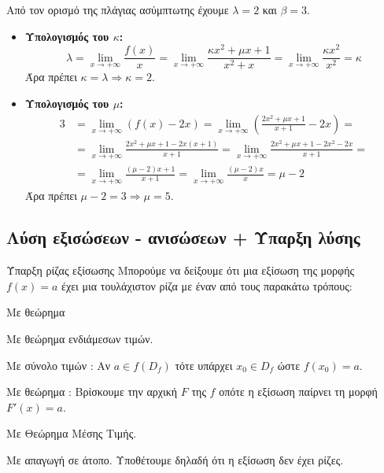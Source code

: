 
\lysh
Από τον ορισμό της πλάγιας ασύμπτωτης έχουμε $\lambda=2$ και $\beta=3$.
\begin{itemize}
    \item \textbf{Υπολογισμός του $\kappa$:}
    \[ \lambda = \lim\limits_{x\to+\infty} \frac{f(x)}{x} = \lim\limits_{x\to+\infty} \frac{\kappa x^2+\mu x + 1}{x^2+x} = \lim\limits_{x\to+\infty} \frac{\kappa x^2}{x^2} = \kappa \]
    Άρα πρέπει $\kappa = \lambda \Rightarrow {\kappa = 2}$.
    \item \textbf{Υπολογισμός του $\mu$:}
\begin{align*}
     3 &= \lim\limits_{x\to+\infty} (f(x) - 2x) = \lim\limits_{x\to+\infty} \left( \frac{2x^2+\mu x + 1}{x+1} - 2x \right)  =\\&=\lim\limits_{x\to+\infty} \frac{2x^2+\mu x + 1 - 2x(x+1)}{x+1} = \lim\limits_{x\to+\infty} \frac{2x^2+\mu x + 1 - 2x^2 - 2x}{x+1} =\\&= \lim\limits_{x\to+\infty} \frac{(\mu-2)x + 1}{x+1} = \lim\limits_{x\to+\infty} \frac{(\mu-2)x}{x} = \mu-2
\end{align*}
    Άρα πρέπει $\mu - 2 = 3 \Rightarrow {\mu = 5}$.
\end{itemize}

\subsection{Λύση εξισώσεων - ανισώσεων + Ύπαρξη λύσης}
\begin{askhsh}{Ύπαρξη ρίζας εξίσωσης}
Μπορούμε να δείξουμε ότι μια εξίσωση της μορφής $ f(x)=a $ έχει μια τουλάχιστον ρίζα με έναν από τους παρακάτω τρόπους:
\\\tropoi\begin{tropos}
\item Με θεώρημα 
\item Με θεώρημα ενδιάμεσων τιμών.
\item Με σύνολο τιμών : Αν $ a\in f(D_f) $ τότε υπάρχει $ x_0\in D_f $ ώστε $ f(x_0)=a $.
\item Με θεώρημα  : Βρίσκουμε την αρχική $ F $ της $ f $ οπότε η εξίσωση παίρνει τη μορφή $ F'(x)=a $.
\item Με Θεώρημα Μέσης Τιμής.
\item Με απαγωγή σε άτοπο. Υποθέτουμε δηλαδή ότι η εξίσωση δεν έχει ρίζες.
\end{tropos}
\end{askhsh}

